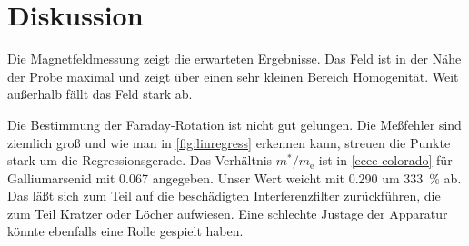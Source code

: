 
\section{Diskussion}
Die Magnetfeldmessung zeigt die erwarteten Ergebnisse. Das Feld ist in
der Nähe der Probe maximal und zeigt über einen sehr kleinen Bereich
Homogenität.  Weit außerhalb fällt das Feld stark ab.

Die Bestimmung der Faraday-Rotation ist nicht gut gelungen.  Die
Meßfehler sind ziemlich groß und wie man in \cref{fig:linregress}
erkennen kann, streuen die Punkte stark um die Regressionsgerade. Das
Verhältnis $m^*/m_\text{e}$ ist in \cref{ecee-colorado} für
Galliumarsenid mit \num{0.067} angegeben.  Unser Wert weicht mit
\num{0.290} um \SI{333}{\percent} ab.  Das läßt sich zum Teil auf
die beschädigten Interferenzfilter zurückführen, die zum Teil Kratzer
oder Löcher aufwiesen.  Eine schlechte Justage der Apparatur könnte
ebenfalls eine Rolle gespielt haben.
